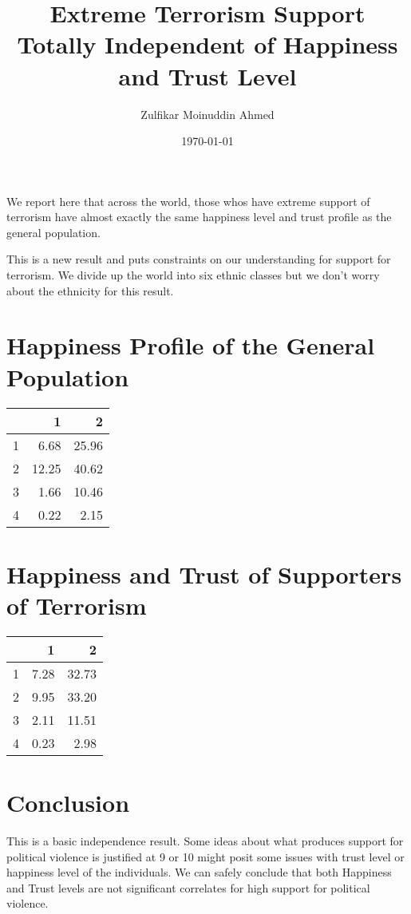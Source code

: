 \documentclass{amsart}
\title{Extreme Terrorism Support Totally Independent of Happiness and Trust Level}
\author{Zulfikar Moinuddin Ahmed}
\date{\today}
\begin{document}
\maketitle

We report here that across the world, those whos have extreme support of terrorism have almost exactly the same happiness level and trust profile as the general population.

This is a new result and puts constraints on our understanding for support for terrorism.  We divide up the world into six ethnic classes but we don't worry about the ethnicity for this result.

\section{Happiness Profile of the General Population}

\begin{table}[ht]
\centering
\begin{tabular}{rrr}
  \hline
 & 1 & 2 \\ 
  \hline
1 & 6.68 & 25.96 \\ 
  2 & 12.25 & 40.62 \\ 
  3 & 1.66 & 10.46 \\ 
  4 & 0.22 & 2.15 \\ 
   \hline
\end{tabular}
\end{table}

\section{Happiness and Trust of Supporters of Terrorism}

\begin{table}[ht]
\centering
\begin{tabular}{rrr}
  \hline
 & 1 & 2 \\ 
  \hline
1 & 7.28 & 32.73 \\ 
  2 & 9.95 & 33.20 \\ 
  3 & 2.11 & 11.51 \\ 
  4 & 0.23 & 2.98 \\ 
   \hline
\end{tabular}
\end{table}

\section{Conclusion}

This is a basic independence result.  Some ideas about what produces support for political violence is justified at 9 or 10 might posit some issues with trust level or happiness level of the individuals.  We can safely conclude that both Happiness and Trust levels are not significant correlates for high support for political violence.
\end{document}
